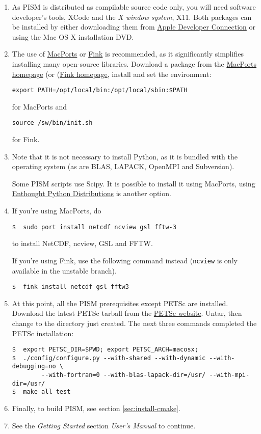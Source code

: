\documentclass[11pt,final]{amsart}
\begin{document}
\begin{enumerate}
\item As PISM is distributed as compilable source code only, you will need software developer's tools, XCode and the \emph{X
    window system}, X11. Both packages can be installed by either downloading them from
  \href{http://developer.apple.com/tools/xcode/}{Apple Developer Connection} or using the Mac OS X installation DVD.
\item The use of \href{http://www.macports.org/}{MacPorts} or \href{http://www.finkproject.org/}{Fink} is recommended, as it significantly simplifies installing many
  open-source libraries. Download a package from the \href{http://www.macports.org/install.php}{MacPorts homepage} (or
  (\href{http://www.finkproject.org/download/index.php}{Fink homepage}, install and set the environment:

\begin{verbatim}
export PATH=/opt/local/bin:/opt/local/sbin:$PATH
\end{verbatim}
for MacPorts and
\begin{verbatim}
source /sw/bin/init.sh
\end{verbatim}
for Fink.

\item Note that it is not necessary to install Python, as it is bundled with the operating system (as are BLAS, LAPACK, OpenMPI
  and Subversion).

  Some PISM scripts use Scipy. It is possible to install it using MacPorts,  using \href{http://www.enthought.com/}{Enthought Python Distributions} is another option.

\item  If you're using MacPorts, do
\begin{verbatim}
$  sudo port install netcdf ncview gsl fftw-3
\end{verbatim}%
to install NetCDF, ncview, GSL and FFTW.

If you're using Fink, use the following command instead (\texttt{ncview} is only available in the unstable branch).
\begin{verbatim}
$  fink install netcdf gsl fftw3
\end{verbatim}

\item At this point, all the PISM prerequisites except PETSc are installed. Download the latest PETSc tarball from the
  \href{http://www.mcs.anl.gov/petsc/petsc-as/}{PETSc website}. Untar, then change to the directory just created.
The next three commands completed the PETSc installation:
\begin{verbatim}
$  export PETSC_DIR=$PWD; export PETSC_ARCH=macosx;
$  ./config/configure.py --with-shared --with-dynamic --with-debugging=no \
        --with-fortran=0 --with-blas-lapack-dir=/usr/ --with-mpi-dir=/usr/
$  make all test
\end{verbatim}
\item Finally, to build PISM, see section \ref{sec:install-cmake}.

\item See the \emph{Getting Started} section \emph{User's Manual} to continue.
\end{enumerate}
\end{document}
